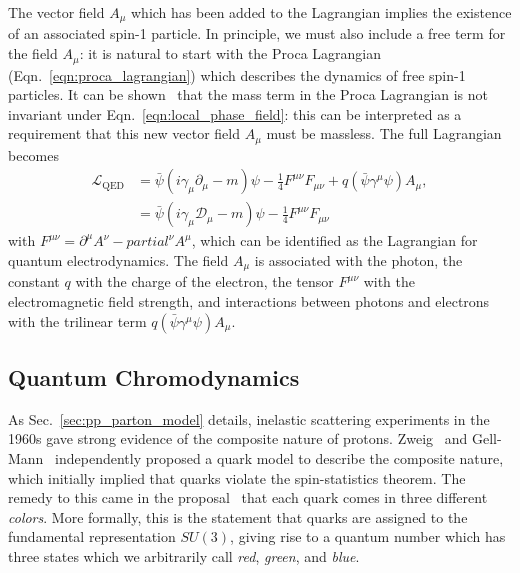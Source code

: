 The vector field $A_\mu$ which has been added to the Lagrangian implies the existence of an associated spin-1 particle.
In principle, we must also include a free term for the field $A_\mu$: it is natural to start with the Proca Lagrangian (Eqn.~\ref{eqn:proca_lagrangian}) which describes the dynamics of free spin-1 particles.
It can be shown~\cite{Griffiths:2008zz} that the mass term in the Proca Lagrangian is not invariant under Eqn.~\ref{eqn:local_phase_field}: this can be interpreted as a requirement that this new vector field $A_\mu$ must be massless.
The full Lagrangian becomes
\begin{align}
    \mathcal L_{\text{QED}} &= \bar{\psi}(i \gamma_\mu \partial_\mu - m) \psi - \frac{1}{4} F^{\mu\nu}F_{\mu\nu} + q (\bar{\psi}\gamma^\mu \psi)A_\mu, \\
                            &= \bar{\psi}(i \gamma_\mu \mathcal D_\mu - m)\psi - \frac{1}{4} F^{\mu\nu}F_{\mu\nu}
\end{align}
with $F^{\mu\nu} = \partial^\mu A^\nu - partial^\nu A^\mu$, which can be identified as the Lagrangian for quantum electrodynamics.
The field $A_\mu$ is associated with the photon, the constant $q$ with the charge of the electron, the tensor $F^{\mu\nu}$ with the electromagnetic field strength, and interactions between photons and electrons with the trilinear term $q (\bar{\psi}\gamma^\mu \psi)A_\mu$. 

\subsection{Quantum Chromodynamics} \label{sec:theory_qcd}
As Sec.~\ref{sec:pp_parton_model} details, inelastic scattering experiments in the 1960s gave strong evidence of the composite nature of protons.
Zweig~\cite{Zweig:1964jf} and Gell-Mann~\cite{GellMann:1964nj} independently proposed a quark model to describe the composite nature, which initially implied that quarks violate the spin-statistics theorem.
The remedy to this came in the proposal~\cite{Greenberg:1964pe} that each quark comes in three different \emph{colors}.
More formally, this is the statement that quarks are assigned to the fundamental representation $SU(3)$, giving rise to a quantum number which has three states which we arbitrarily call \emph{red}, \emph{green}, and \emph{blue}.

